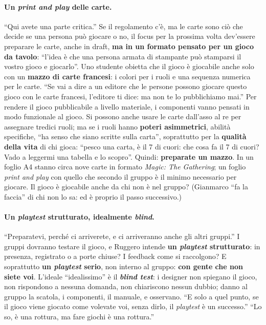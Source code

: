 \paragraph{Un \emph{print and play} delle carte.} ``Qui avete una parte critica.'' Se il
regolamento c'è, ma le carte sono ciò che decide se una persona può giocare o no, il focus
per la prossima volta dev'essere preparare le carte, anche in draft, \textbf{ma in un
formato pensato per un gioco da tavolo}: ``l'idea è che una persona armata di stampante
può stamparsi il vostro gioco e giocarlo''. Uno studente obietta che il gioco è giocabile
anche solo con un \textbf{mazzo di carte francesi}: i colori per i ruoli e una sequenza
numerica per le carte. ``Se vai a dire a un editore che le persone possono giocare questo
gioco con le carte francesi, l'editore ti dice: ma non te lo pubblichiamo mai.'' Per
rendere il gioco pubblicabile a livello materiale, i componenti vanno pensati in modo
funzionale al gioco. Si possono anche usare le carte dall'asso al re per assegnare tredici
ruoli; ma se i ruoli hanno \textbf{poteri asimmetrici}, abilità specifiche, ``ha senso che
siano scritte sulla carta'', soprattutto per la \textbf{qualità della vita} di chi gioca:
``pesco una carta, è il 7 di cuori: che cosa fa il 7 di cuori? Vado a leggermi una tabella
e lo scopro''. Quindi: \textbf{preparate un mazzo}. In un foglio A4 stanno circa nove carte
in formato \emph{Magic: The Gathering}; un foglio \emph{print and play} con quello che
secondo il gruppo è il minimo necessario per giocare. Il gioco è giocabile anche da chi
non è nel gruppo? (Gianmarco ``fa la faccia'' di chi non lo sa: ed è proprio il passo
successivo.)

\paragraph{Un \emph{playtest} strutturato, idealmente \emph{blind}.} ``Preparatevi, perché
ci arriverete, e ci arriveranno anche gli altri gruppi.'' I gruppi dovranno testare il
gioco, e Ruggero intende \textbf{un \emph{playtest} strutturato}: in presenza, registrato
o a porte chiuse? I feedback come si raccolgono? E soprattutto \textbf{un \emph{playtest}
serio}, non interno al gruppo: \textbf{con gente che non siete voi}. L'ideale ``idealissimo''
è il \textbf{\emph{blind test}}: i designer non spiegano il gioco, non rispondono a nessuna
domanda, non chiariscono nessun dubbio; danno al gruppo la scatola, i componenti, il
manuale, e osservano. ``E solo a quel punto, se il gioco viene giocato come volevate voi,
senza dirlo, il \emph{playtest} è un successo.'' ``Lo so, è una rottura, ma fare giochi è
una rottura.''

